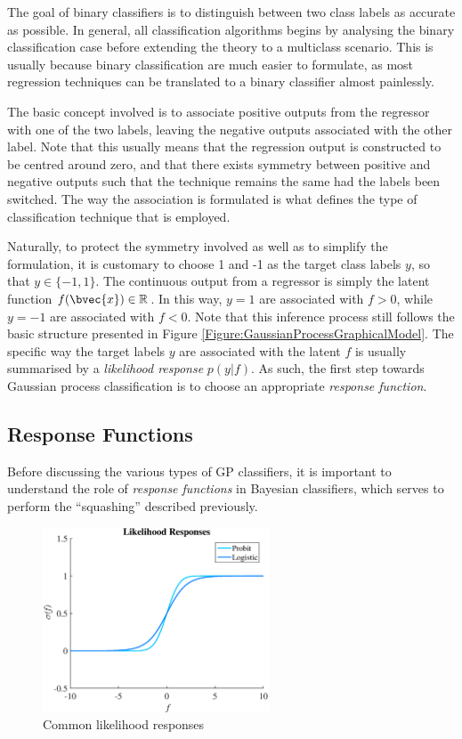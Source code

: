 			The goal of binary classifiers is to distinguish between two class labels as accurate as possible. In general, all classification algorithms begins by analysing the binary classification case before extending the theory to a multiclass scenario. This is usually because binary classification are much easier to formulate, as most regression techniques can be translated to a binary classifier almost painlessly.
			
			The basic concept involved is to associate positive outputs from the regressor with one of the two labels, leaving the negative outputs associated with the other label. Note that this usually means that the regression output is constructed to be centred around zero, and that there exists symmetry between positive and negative outputs such that the technique remains the same had the labels been switched. The way the association is formulated is what defines the type of classification technique that is employed.
			
			Naturally, to protect the symmetry involved as well as to simplify the formulation, it is customary to choose 1 and -1 as the target class labels $y$, so that $y \in \{-1, 1\}$. The continuous output from a regressor is simply the latent function $f(\bvec{x}) \in \mathbb{R}$. In this way, $y = 1$ are associated with $f > 0$, while $y = -1$ are associated with $f < 0$. Note that this inference process still follows the basic structure presented in Figure \ref{Figure:GaussianProcessGraphicalModel}. The specific way the target labels $y$ are associated with the latent $f$ is usually summarised by a \textit{likelihood response} $p(y | f)$. As such, the first step towards Gaussian process classification is to choose an appropriate \textit{response function}.
			
		\subsection{Response Functions}
		\label{BenthicHabitatMapping:Classification:ResponseFunction}
		
			Before discussing the various types of GP classifiers, it is important to understand the role of \textit{response functions} in Bayesian classifiers, which serves to perform the ``squashing'' described previously.

			\begin{figure}[!htbp]
				\centering
					\includegraphics[width=0.6\textwidth]{Figures/responses.eps}
				\caption{Common likelihood responses}
				\label{Figure:LikelihoodResponses}
			\end{figure}
					
